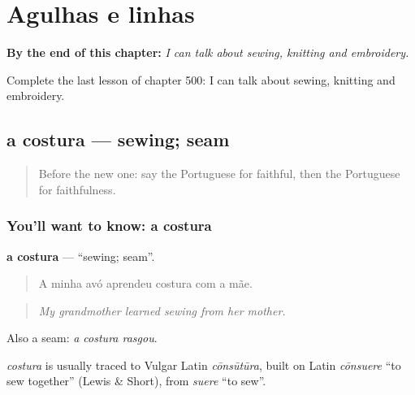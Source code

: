
\chapter{Agulhas e linhas}
\label{ch:pt-agulhas-e-linhas}

\begin{chapteropening}
\textbf{By the end of this chapter:} \emph{I can talk about sewing, knitting and embroidery.}

Complete the last lesson of chapter 500: I can talk about sewing, knitting and embroidery.
\end{chapteropening}

\section[a costura]{a costura — sewing; seam}

\label{lesson:PT-C500-costura}



\begin{quote}
Before the new one: say the Portuguese for faithful, then the Portuguese for faithfulness.
\end{quote}

\subsection*{You'll want to know: a costura}
\textbf{a costura} — \textquotedblleft{}sewing; seam\textquotedblright{}.

\begin{quote}
A minha avó aprendeu costura com a mãe.
\end{quote}

\begin{quote}
\emph{My grandmother learned sewing from her mother.}
\end{quote}

Also a seam: \emph{a costura rasgou}.

\begin{cousinweb}
\emph{costura} is usually traced to Vulgar Latin \emph{cōnsūtūra}, built on Latin \emph{cōnsuere} \textquotedblleft{}to sew together\textquotedblright{} (Lewis \& Short), from \emph{suere} \textquotedblleft{}to sew\textquotedblright{}.
\end{cousinweb}

